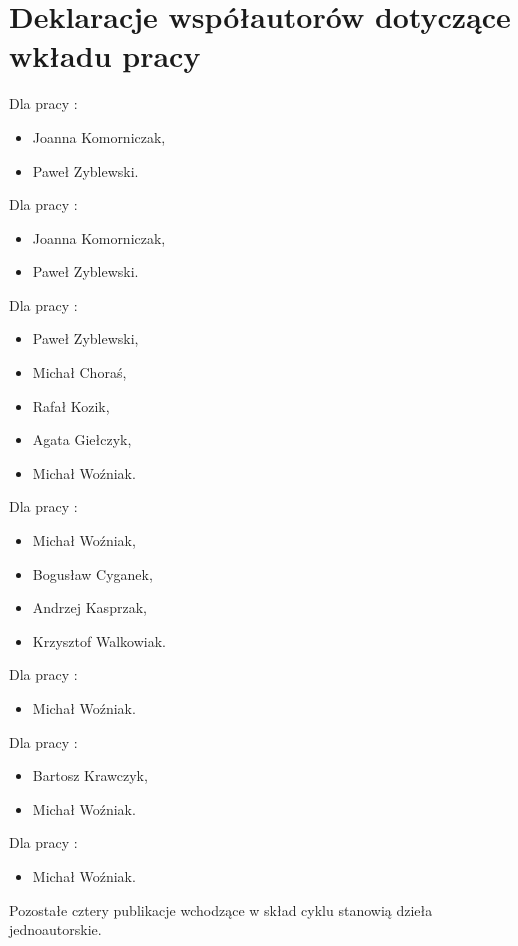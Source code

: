 \chapter{Deklaracje współautorów dotyczące wkładu pracy}

\begin{fullwidth}
	

Dla pracy :

\begin{itemize}
	\item Joanna Komorniczak,
	\item Paweł Zyblewski.
\end{itemize}

Dla pracy :

\begin{itemize}
	\item Joanna Komorniczak,
	\item Paweł Zyblewski.
\end{itemize}

Dla pracy :

\begin{itemize}
	\item Paweł Zyblewski,
	\item Michał Choraś,
	\item Rafał Kozik,
	\item Agata Giełczyk,
	\item Michał Woźniak.
\end{itemize}

Dla pracy :

\begin{itemize}
	\item Michał Woźniak,
	\item Bogusław Cyganek,
	\item Andrzej Kasprzak,
	\item Krzysztof Walkowiak.
\end{itemize}

Dla pracy :

\begin{itemize}
	\item Michał Woźniak.
\end{itemize}

Dla pracy :

\begin{itemize}
	\item Bartosz Krawczyk,
	\item Michał Woźniak.
\end{itemize}

Dla pracy :

\begin{itemize}
	\item Michał Woźniak.
\end{itemize}

Pozostałe cztery publikacje wchodzące w skład cyklu stanowią dzieła jednoautorskie.

\end{fullwidth}


